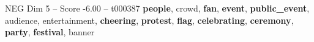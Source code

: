\begin{textsample}{NEG Dim 5 – Score -6.00 – t000387}  \label{ex:f5_neg_027}
\textbf{people}, crowd, \textbf{fan}, \textbf{event}, \textbf{public\_event}, audience, entertainment, \textbf{cheering}, \textbf{protest}, \textbf{flag}, \textbf{celebrating}, \textbf{ceremony}, \textbf{party}, \textbf{festival}, banner

\end{textsample}
